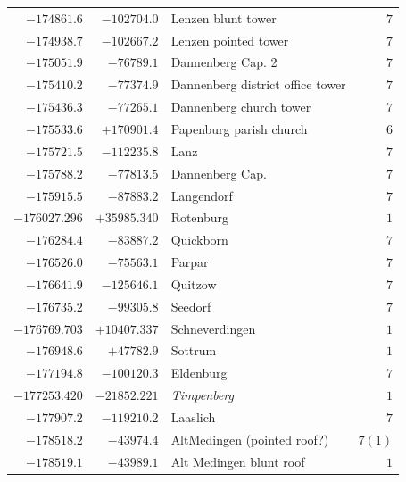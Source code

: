 \begin{center}
\begin{tabular}{r|r|p{170pt}|r}
\(-174861.6\)&\(-102704.0\)&Lenzen blunt tower&\(7\)\\
\(-174938.7\)&\(-102667.2\)&Lenzen pointed tower&\(7\)\\
\(-175051.9\)&\(-76789.1\)&Dannenberg Cap. 2&\(7\)\\
\(-175410.2\)&\(-77374.9\)&Dannenberg district office tower&\(7\)\\
\(-175436.3\)&\(-77265.1\)&Dannenberg church tower&\(7\)\\
\(-175533.6\)&\(+170901.4\)&Papenburg parish church&\(6\)\\
\(-175721.5\)&\(-112235.8\)&Lanz&\(7\)\\
\(-175788.2\)&\(-77813.5\)&Dannenberg Cap.&\(7\)\\
\(-175915.5\)&\(-87883.2\)&Langendorf&\(7\)\\
\(-176027.296\)&\(+35985.340\)&Rotenburg&\(1\)\\
\(-176284.4\)&\(-83887.2\)&Quickborn&\(7\)\\
\(-176526.0\)&\(-75563.1\)&Parpar&\(7\)\\
\(-176641.9\)&\(-125646.1\)&Quitzow&\(7\)\\
\(-176735.2\)&\(-99305.8\)&Seedorf&\(7\)\\
\(-176769.703\)&\(+10407.337\)&Schneverdingen&\(1\)\\
\(-176948.6\)&\(+47782.9\)&Sottrum&\(1\)\\
\(-177194.8\)&\(-100120.3\)&Eldenburg&\(7\)\\
\(-177253.420\)&\(-21852.221\)&\textit{Timpenberg}&\(1\)\\
\(-177907.2\)&\(-119210.2\)&Laaslich&\(7\)\\
\(-178518.2\)&\(-43974.4\)&AltMedingen (pointed roof?)&\(7 (1)\)\\
\(-178519.1\)&\(-43989.1\)&Alt Medingen blunt roof&\(1\)\\
\hline\end{tabular}\endgroup\end{center}
